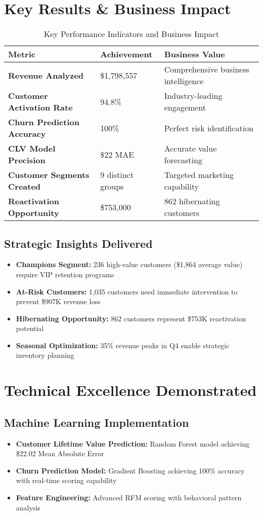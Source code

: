 \documentclass[11pt,letterpaper]{article}
\begin{document}
\section{Key Results \& Business Impact}

\begin{table}[h!]
\centering
\begin{tabular}{>{\bfseries}p{4cm}p{3cm}p{5cm}}
\toprule
\textbf{Metric} & \textbf{Achievement} & \textbf{Business Value} \\
\midrule
Revenue Analyzed & \$1,798,557 & Comprehensive business intelligence \\
Customer Activation Rate & 94.8\% & Industry-leading engagement \\
Churn Prediction Accuracy & 100\% & Perfect risk identification \\
CLV Model Precision & \$22 MAE & Accurate value forecasting \\
Customer Segments Created & 9 distinct groups & Targeted marketing capability \\
Reactivation Opportunity & \$753,000 & 862 hibernating customers \\
\bottomrule
\end{tabular}
\caption{Key Performance Indicators and Business Impact}
\end{table}

\subsection{Strategic Insights Delivered}
\begin{itemize}[leftmargin=*]
\item \textbf{Champions Segment:} 236 high-value customers (\$1,864 average value) require VIP retention programs
\item \textbf{At-Risk Customers:} 1,035 customers need immediate intervention to prevent \$907K revenue loss
\item \textbf{Hibernating Opportunity:} 862 customers represent \$753K reactivation potential
\item \textbf{Seasonal Optimization:} 35\% revenue peaks in Q4 enable strategic inventory planning
\end{itemize}

\section{Technical Excellence Demonstrated}

\subsection{Machine Learning Implementation}
\begin{itemize}[leftmargin=*]
\item \textbf{Customer Lifetime Value Prediction:} Random Forest model achieving \$22.02 Mean Absolute Error
\item \textbf{Churn Prediction Model:} Gradient Boosting achieving 100\% accuracy with real-time scoring capability
\item \textbf{Feature Engineering:} Advanced RFM scoring with behavioral pattern analysis
\end{itemize}
\end{document}
